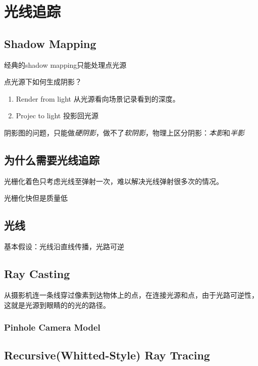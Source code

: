 \chapter{光线追踪}

\section{Shadow Mapping}

经典的shadow mapping只能处理点光源

点光源下如何生成阴影？

\begin{enumerate}
    \item Render from light 从光源看向场景记录看到的深度。
    \item Projec to light 投影回光源
\end{enumerate}

阴影图的问题，只能做\textsl{硬阴影}，做不了\textsl{软阴影}，物理上区分阴影：\textsl{本影}和\textsl{半影}

\section{为什么需要光线追踪}

光栅化着色只考虑光线至弹射一次，难以解决光线弹射很多次的情况。

光栅化快但是质量低

\section{光线}

基本假设：光线沿直线传播，光路可逆

\section{Ray Casting}

从摄影机连一条线穿过像素到达物体上的点，在连接光源和点，由于光路可逆性，这就是光源到眼睛的的光的路径。

\subsection*{Pinhole Camera Model}

\section{Recursive(Whitted-Style) Ray Tracing}

